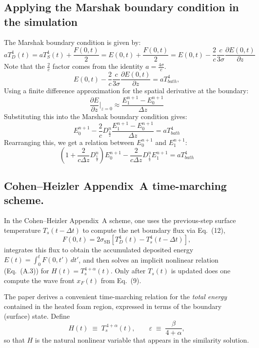 \documentclass{article}
\begin{document}
\subsection*{Applying the Marshak boundary condition in the simulation}
The Marshak boundary condition is given by:
\[
aT_D^4(t)
= aT_S^4(t)+\frac{F(0,t)}{2} = E(0,t)+\frac{F(0,t)}{2} = E(0,t) - \frac{2}{c} \frac{c}{3\sigma} \frac{\partial E(0,t)}{\partial z}
\]
Note that the $\frac{2}{c}$ factor comes from the identity $a = \frac{4\sigma}{c}$.
\begin{equation}
E(0,t)- \frac{2}{c} \frac{c}{3\sigma}\frac{\partial E(0,t)}{\partial z} = aT_{bath}^4,
\end{equation}
Using a finite difference approximation for the spatial derivative at the boundary:
\begin{equation}
\frac{\partial E}{\partial z}|_{z=0} \approx \frac{E_1^{n+1} - E_0^{n+1}}{\Delta z}
\end{equation}
Substituting this into the Marshak boundary condition gives:
\begin{equation}
E_0^{n+1} - \frac{2}{c} D_{\frac{1}{2}}^n\frac{E_1^{n+1} - E_0^{n+1}}{\Delta z} = aT_{bath}^4
\end{equation}
Rearranging this, we get a relation between $E_0^{n+1}$ and $E_1^{n+1}$:
\begin{equation}
\left(1 + \frac{2}{c\Delta z} D_{\frac{1}{2}}^n\right) E_0^{n+1} - \frac{2}{c\Delta z} D_{\frac{1}{2}}^n E_1^{n+1} = aT_{bath}^4
\end{equation}

\subsection*{Cohen--Heizler Appendix~A time-marching scheme.}
In the Cohen--Heizler Appendix~A scheme, one uses the previous-step surface temperature \(T_s(t-\Delta t)\) to compute the net boundary flux via Eq.~(12),
\[
F(0,t)=2\sigma_{\mathrm{SB}}\!\left[T_D^4(t)-T_s^4(t-\Delta t)\right],
\]
integrates this flux to obtain the accumulated deposited energy \(E(t)=\int_0^t F(0,t')\,dt'\), and then solves an implicit nonlinear relation (Eq.~(A.3)) for
\(H(t)=T_s^{4+\alpha}(t)\). Only after \(T_s(t)\) is updated does one compute the wave front \(x_F(t)\) from Eq.~(9).

The paper derives a convenient time-marching relation for the \emph{total energy} contained in the heated foam region, expressed in terms of the boundary (surface) state. Define
\begin{equation}
H(t) \;\equiv\; T_s^{\,4+\alpha}(t),
\qquad
\varepsilon \;\equiv\; \frac{\beta}{4+\alpha},
\end{equation}
so that $H$ is the natural nonlinear variable that appears in the similarity solution.
\end{document}
